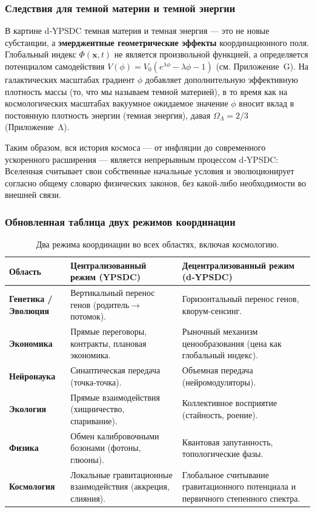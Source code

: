 \documentclass[11pt,a4paper]{article}
\begin{document}
	\subsubsection*{Следствия для темной материи и темной энергии}
	В картине d‑YPSDC темная материя и темная энергия — это не новые
	субстанции, а \textbf{эмерджентные геометрические эффекты} координационного поля.  Глобальный индекс \(\Phi(\mathbf{x},t)\) не является произвольной
	функцией, а определяется потенциалом самодействия
	\(V(\phi) = V_0 (e^{\lambda \phi} - \lambda \phi - 1)\) (см.
	Приложение~G).  На галактических масштабах градиент \(\phi\) добавляет дополнительную
	эффективную плотность массы (то, что мы называем темной материей), в то время как на космологических
	масштабах вакуумное ожидаемое значение \(\phi\) вносит вклад в постоянную
	плотность энергии (темная энергия), давая \(\Omega_\Lambda = 2/3\)
	(Приложение~Λ).
	
	Таким образом, вся история космоса — от инфляции до современного
	ускоренного расширения — является непрерывным процессом d‑YPSDC: Вселенная
	считывает свои собственные начальные условия и эволюционирует согласно общему
	словарю физических законов, без какой-либо необходимости во внешней
	связи.
	
	\subsubsection*{Обновленная таблица двух режимов координации}
	\begin{table}[htbp]
		\centering
		\caption{Два режима координации во всех областях, включая космологию.}
		\label{tab:two-regimes-full}
		\small
		\begin{tabular}{p{2.5cm}p{4.5cm}p{4.5cm}}
			\toprule
			\textbf{Область} & \textbf{Централизованный режим (YPSDC)} & \textbf{Децентрализованный режим (d‑YPSDC)} \\
			\midrule
			\textbf{Генетика / Эволюция} &
			Вертикальный перенос генов (родитель$\to$потомок). &
			Горизонтальный перенос генов, кворум-сенсинг. \\
			\midrule
			\textbf{Экономика} &
			Прямые переговоры, контракты, плановая экономика. &
			Рыночный механизм ценообразования (цена как глобальный индекс). \\
			\midrule
			\textbf{Нейронаука} &
			Синаптическая передача (точка‑точка). &
			Объемная передача (нейромодуляторы). \\
			\midrule
			\textbf{Экология} &
			Прямые взаимодействия (хищничество, спаривание). &
			Коллективное восприятие (стайность, роение). \\
			\midrule
			\textbf{Физика} &
			Обмен калибровочными бозонами (фотоны, глюоны). &
			Квантовая запутанность, топологические фазы. \\
			\midrule
			\textbf{Космология} &
			Локальные гравитационные взаимодействия (аккреция, слияния). &
			Глобальное считывание гравитационного потенциала и первичного степенного спектра. \\
			\bottomrule
		\end{tabular}
	\end{table}
	
\end{document}
